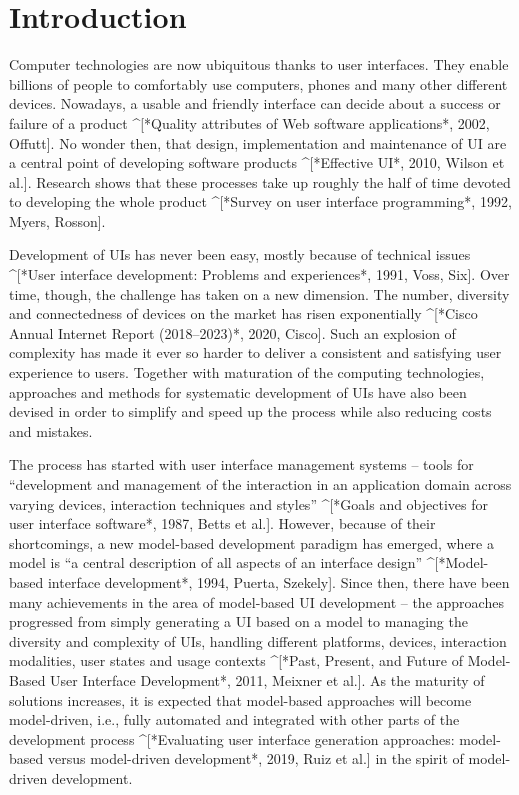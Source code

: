 \section{Introduction}\label{sec:introduction}

Computer technologies are now ubiquitous thanks to user interfaces.
They enable billions of people to comfortably use computers, phones and many other different devices.
Nowadays, a usable and friendly interface can decide about a success or failure of a product ^[*Quality attributes of Web software applications*, 2002, Offutt].
No wonder then, that design, implementation and maintenance of UI are a central point of developing software products ^[*Effective UI*, 2010, Wilson et al.].
Research shows that these processes take up roughly the half of time devoted to developing the whole product ^[*Survey on user interface programming*, 1992, Myers, Rosson].

Development of UIs has never been easy, mostly because of technical issues ^[*User interface development: Problems and experiences*, 1991, Voss, Six].
Over time, though, the challenge has taken on a new dimension.
The number, diversity and connectedness of devices on the market has risen exponentially ^[*Cisco Annual Internet Report (2018–2023)*, 2020, Cisco].
Such an explosion of complexity has made it ever so harder to deliver a consistent and satisfying user experience to users.
Together with maturation of the computing technologies, approaches and methods for systematic development of UIs have also been devised in order to simplify and speed up the process while also reducing costs and mistakes.

The process has started with user interface management systems – tools for “development and management of the interaction in an application domain across varying devices, interaction techniques and styles” ^[*Goals and objectives for user interface software*, 1987, Betts et al.].
However, because of their shortcomings, a new model-based development paradigm has emerged, where a model is “a central description of all aspects of an interface design” ^[*Model-based interface development*, 1994, Puerta, Szekely].
Since then, there have been many achievements in the area of model-based UI development – the approaches progressed from simply generating a UI based on a model to managing the diversity and complexity of UIs, handling different platforms, devices, interaction modalities, user states and usage contexts ^[*Past, Present, and Future of Model-Based User Interface Development*, 2011, Meixner et al.].
As the maturity of solutions increases, it is expected that model-based approaches will become model-driven, i.e., fully automated and integrated with other parts of the development process ^[*Evaluating user interface generation approaches: model-based versus model-driven development*, 2019, Ruiz et al.] in the spirit of model-driven development.


